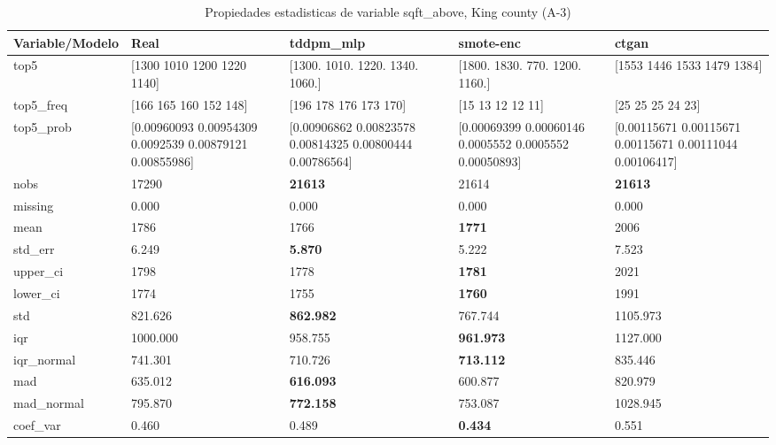 \begin{table}[H]
\centering
\fontsize{8}{14}\selectfont
\caption{Propiedades  estadisticas de variable sqft\_above, King county (A-3)}
\label{table-stats-king county-a-3-sqft_above}
\begin{tabular}{|l|m{10em}|m{10em}|m{10em}|m{10em}|}
\hline
 \rowcolor[gray]{0.8}
Variable/Modelo & Real & tddpm\_mlp & smote-enc & ctgan \\
\hline top5 & [1300 1010 1200 1220 1140] & [1300. 1010. 1220. 1340. 1060.] & [1800. 1830.  770. 1200. 1160.] & [1553 1446 1533 1479 1384] \\
\hline top5\_freq & [166 165 160 152 148] & [196 178 176 173 170] & [15 13 12 12 11] & [25 25 25 24 23] \\
\hline top5\_prob & [0.00960093 0.00954309 0.0092539  0.00879121 0.00855986] & [0.00906862 0.00823578 0.00814325 0.00800444 0.00786564] & [0.00069399 0.00060146 0.0005552  0.0005552  0.00050893] & [0.00115671 0.00115671 0.00115671 0.00111044 0.00106417] \\
\hline nobs & 17290 & \bfseries 21613 & \cellcolor[rgb]{0.9, 0.54, 0.52} 21614 & \bfseries 21613 \\
\hline missing & 0.000 & 0.000 & 0.000 & 0.000 \\
\hline mean & 1786 & 1766 & \bfseries 1771 & \cellcolor[rgb]{0.9, 0.54, 0.52} 2006 \\
\hline std\_err & 6.249 & \bfseries 5.870 & 5.222 & \cellcolor[rgb]{0.9, 0.54, 0.52} 7.523 \\
\hline upper\_ci & 1798 & 1778 & \bfseries 1781 & \cellcolor[rgb]{0.9, 0.54, 0.52} 2021 \\
\hline lower\_ci & 1774 & 1755 & \bfseries 1760 & \cellcolor[rgb]{0.9, 0.54, 0.52} 1991 \\
\hline std & 821.626 & \bfseries 862.982 & 767.744 & \cellcolor[rgb]{0.9, 0.54, 0.52} 1105.973 \\
\hline iqr & 1000.000 & 958.755 & \bfseries 961.973 & \cellcolor[rgb]{0.9, 0.54, 0.52} 1127.000 \\
\hline iqr\_normal & 741.301 & 710.726 & \bfseries 713.112 & \cellcolor[rgb]{0.9, 0.54, 0.52} 835.446 \\
\hline mad & 635.012 & \bfseries 616.093 & 600.877 & \cellcolor[rgb]{0.9, 0.54, 0.52} 820.979 \\
\hline mad\_normal & 795.870 & \bfseries 772.158 & 753.087 & \cellcolor[rgb]{0.9, 0.54, 0.52} 1028.945 \\
\hline coef\_var & 0.460 & 0.489 & \bfseries 0.434 & \cellcolor[rgb]{0.9, 0.54, 0.52} 0.551 \\

\end{tabular}
\end{table}
